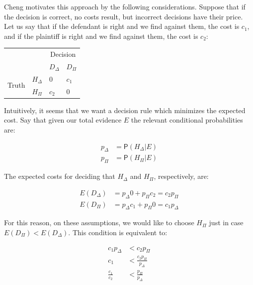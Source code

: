 \documentclass[10pt,dvipsnames,enabledeprecatedfontcommands]{scrartcl}
\newcommand{\pr}[1]{\mathsf{P}(#1)}
\begin{document}
Cheng motivates this approach by the following considerations. Suppose
that if the decision is correct, no costs result, but incorrect
decisions have their price. Let us say that if the defendant is right
and we find against them, the cost is \(c_1\), and if the plaintiff is
right and we find against them, the cost is \(c_2\):

\begin{center}
\begin{tabular}
{@{}llll@{}}
\toprule
& & \multicolumn{2}{c}{Decision}\\
& &  $D_\Delta$ & $D_\Pi$ \\
\cmidrule{3-4}
\multirow{2}{*}{Truth} &  $H_\Delta$    & $0$    & $c_1$\\
                       &  $H_\Pi$       &  $c_2$   & $0$ \\ 
\bottomrule
\end{tabular}
\end{center}

Intuitively, it seems that we want a decision rule which minimizes the
expected cost. Say that given our total evidence \(E\) the relevant
conditional probabilities are:

\vspace{-6mm}

\begin{align*}
p_\Delta &= \pr{H_\Delta \vert E} \\
p_\Pi & = \pr{H_\Pi \vert E}
\end{align*}

\noindent The expected costs for deciding that \(H_\Delta\) and
\(H_\Pi\), respectively, are:

\begin{align*}
E(D_\Delta) & = p_\Delta 0 + p_\Pi c_2 = c_2p_\Pi\\
E(D_\Pi) & = p_\Delta c_1 + p_\Pi 0 = c_1 p_\Delta
\end{align*}

\noindent For this reason, on these assumptions, we would like to choose
\(H_\Pi\) just in case \(E(D_\Pi) < E(D_\Delta)\). This condition is
equivalent to:

\vspace{-6mm}

\begin{align}
\nonumber c_1p_\Delta &< c_2p_\Pi \\
\nonumber c_1 & < \frac{c_2p_\Pi}{p_\Delta}\\
\label{eq:cheng_frac1}\frac{c_1}{c_2} & < \frac{p_\Pi}{p_\Delta}
\end{align}
\end{document}
